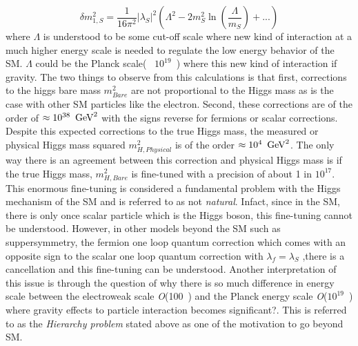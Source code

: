 \begin{equation}
\delta m^{2}_{1,S} = \frac{1}{16\pi^{2}}|\lambda_{S}|^{2}\left(\Lambda^{2} - 2m^{2}_{S}\ln\left(\frac{\Lambda}{m_{S}}\right) + ...\right) 
\end{equation}
where $\Lambda$ is understood to be some cut-off scale where new kind of interaction at a much higher energy scale is needed to regulate the low energy behavior of the SM. $\Lambda$ could be the Planck scale(~ $10^{19}$~\GeV) where this new kind of interaction if gravity. The two things to observe from this calculations is that first, corrections to the higgs bare mass $m^{2}_{Bare}$ are not proportional to the Higgs mass as is the case with other SM particles like the electron\cite{}.
Second, these corrections are of the order of $\approx 10^{38}~\,\text{Ge\hspace{-.08em}V}^{2}$  with the signs reverse for fermions or scalar corrections.
Despite this expected  corrections to the true Higgs mass, the measured or physical Higgs mass squared $m^{2}_{H,Physical}$ is of the order $\approx 10^{4}~\,\text{Ge\hspace{-.08em}V}^{2}$.
The only way there is an agreement between this correction and physical Higgs mass is if the true Higgs mass, $m^{2}_{H,Bare}$ is fine-tuned with a precision of about 1 in $10^{17}$. This enormous fine-tuning is considered a fundamental problem with the Higgs mechanism of the SM and is referred to as not \textit{natural}. Infact, since in the SM, there is only once scalar particle which is the Higgs boson, this fine-tuning cannot be understood. However, in other models beyond the SM such as suppersymmetry, the fermion one loop quantum correction which comes with an opposite sign to the scalar one loop quantum correction with $\lambda_{f} = \lambda_{S}$ ,there is a cancellation and this fine-tuning can be understood. Another interpretation of this issue is through the question of why there is so much difference in energy scale between the electroweak scale \textit{O}(100~\GeV) and the Planck energy scale \textit{O}($10^{19}$~\GeV) where gravity effects to particle interaction becomes significant?. This is referred to as the \textit{Hierarchy problem} stated above as one of the motivation to go beyond SM.
